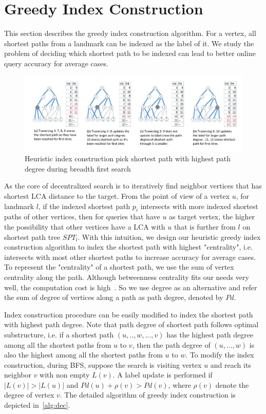\section{Greedy Index Construction}
\label{preprocessing}

This section describes the greedy index construction algorithm. For a vertex, all shortest paths from a landmark can be indexed as the label of it. We study the problem of deciding which shortest path to be indexed can lead to better online query accuracy for average cases. 

\begin{figure}[ht]
    \centering
    \includegraphics[width=\linewidth]{./figures/new_illustrate/bfs_illustrate.pdf}
    \caption{Heuristic index construction pick shortest path with highest path degree during breadth first search}
    \label{fig:bfs_illustrate}
\end{figure}

As the core of decentralized search is to iteratively find neighbor vertices that has shortest LCA distance to the target. From the point of view of a vertex $u$, for landmark $l$, if the indexed shortest path $p_i$ intersects with more indexed shortest paths of other vertices, then for queries that have $u$ as target vertex, the higher the possibility that other vertices have a LCA with $u$ that is further from $l$ on shortest path tree $SPT_l$. With this intuition, we design our heuristic greedy index construction algorithm to index the shortest path with highest "centrality", i.e. intersects with most other shortest paths to increase accuracy for average cases. To represent the "centrality" of a shortest path, we use the sum of vertex centrality along the path. Although betweenness centrality fits our needs very well, the computation cost is high~\cite{Riondato:2014:FAB:2556195.2556224}. So we use degree as an alternative and refer the sum of degree of vertices along a path as path degree, denoted by $Pd$.

Index construction procedure can be easily modified to index the shortest path with highest path degree. Note that path degree of shortest path follows optimal substructure, i.e. if a shortest path $(u, .., w, ..., v)$ has the highest path degree among all the shortest paths from $u$ to $v$, then the path degree of $(u, ..., w)$ is also the highest among all the shortest paths from $u$ to $w$. To modify the index construction, during BFS, suppose the search is visiting vertex $u$ and reach its neighbor $v$ with non empty $L(v)$. A label update is performed if $|L(v)| > |L(u)|$ and $Pd(u) + \rho(v) > Pd(v)$, where $\rho(v)$ denote the degree of vertex $v$. The detailed algorithm of greedy index construction is depicted in~\ref{alg:dec}. 

